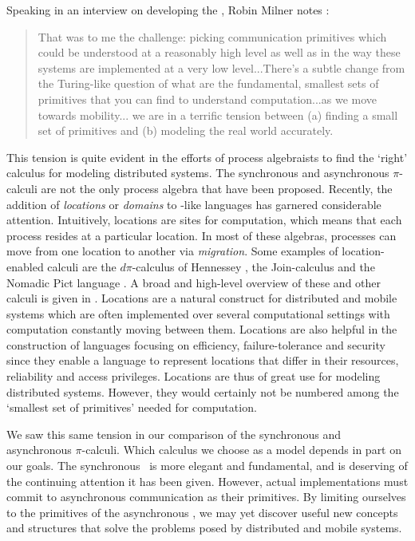 Speaking in an interview on developing the \picalc, Robin Milner notes \cite{miln03}:
\begin{quote}
That was to me the challenge: picking communication primitives which could be understood at a reasonably high level as well as in the way these systems are implemented at a very low level...There's a subtle change from the Turing-like question of what are the fundamental, smallest sets of primitives that you can find to understand computation...as we move towards mobility... we are in a terrific tension between (a) finding a small set of primitives and (b) modeling the real world accurately.
\end{quote}
This tension is quite evident in the efforts of process algebraists to find the `right' calculus for modeling distributed systems.  The synchronous and asynchronous $\pi$-calculi are not the only process algebra that have been proposed.  Recently, the addition of \emph{locations} or \emph{domains} to \picalc-like languages has garnered considerable attention.  Intuitively, locations are sites for computation, which means that each process resides at a particular location.  In most of these algebras, processes can move from one location to another via \emph{migration}.  Some examples of location-enabled calculi are the $d\pi$-calculus of Hennessey \cite{henn07}, the Join-calculus \cite{fourn00} and the Nomadic Pict language \cite{wojci99}.  A broad and high-level overview of these and other calculi is given in \cite{cast02}.  Locations are a natural construct for distributed and mobile systems which are often implemented over several computational settings with computation constantly moving between them.  Locations are also helpful in the construction of languages focusing on efficiency, failure-tolerance and security since they enable a language to represent locations that differ in their resources, reliability and access privileges.  Locations are thus of great use for modeling distributed systems.  However, they would certainly not be numbered among the `smallest set of primitives' needed for computation.

We saw this same tension in our comparison of the synchronous and asynchronous $\pi$-calculi.  
Which calculus we choose as a model depends in part on our goals.
The synchronous \picalc\ is more elegant and fundamental, and is deserving of the continuing attention it has been given.
However, actual implementations must commit to asynchronous communication as their primitives.  
By limiting ourselves to the primitives of the asynchronous \picalc, we may yet discover useful new concepts and structures that solve the problems posed by distributed and mobile systems.  